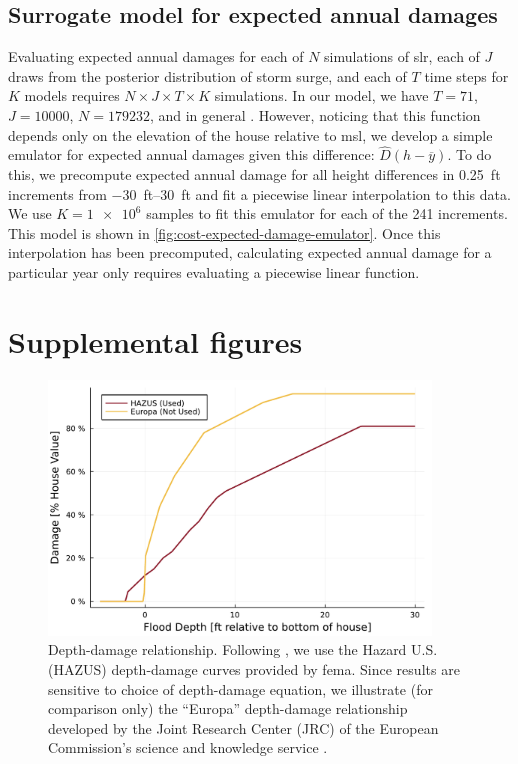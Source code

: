 \documentclass[11pt]{article}
\begin{document}
\subsection{Surrogate model for expected annual damages}\label{sec:surrogate-ead}
Evaluating expected annual damages for each of $N$ simulations of \gls{slr}, each of $J$ draws from the posterior distribution of storm surge, and each of $T$ time steps for $K$ models requires $N \times J \times T \times K$ simulations.
In our model, we have $T=71$, $J=\num{10000}$, $N=\num{179232}$, and in general .
However, noticing that this function depends only on the elevation of the house relative to \gls{msl}, we develop a simple emulator for expected annual damages given this difference: $\hat{D}(h - \overline{y})$.
To do this, we  precompute expected annual damage for all height differences in \SI{0.25}{ft} increments from \SIrange{-30}{30}{ft} and fit a piecewise linear interpolation to this data.
We use $K=\num{1e6}$ samples to fit this emulator for each of the 241 increments.
This model is shown in \cref{fig:cost-expected-damage-emulator}.
Once this interpolation has been precomputed, calculating expected annual damage for a particular year only requires evaluating a piecewise linear function.

\section{Supplemental figures}

\begin{figure}
    \centering
    \includegraphics[width=4in]{cost-depth-damage}
    \caption{
        Depth-damage relationship.
        Following \citet{zarekarizi_suboptimal:2020}, we use the Hazard U.S. (HAZUS) depth-damage curves provided by \gls{fema}.
        Since results are sensitive to choice of depth-damage equation, we illustrate (for comparison only) the ``Europa'' depth-damage relationship developed by the Joint Research Center (JRC) of the European Commission's science and knowledge service \citep{huizinga_depthdamage:2016}.
    }\label{fig:cost-depth-damage}
\end{figure}
\end{document}
